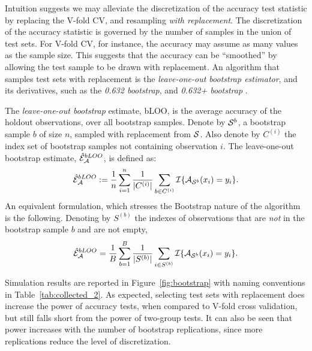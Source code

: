\documentclass[journal]{IEEEtran}
\begin{document}
Intuition suggests we may alleviate the discretization of the accuracy test statistic by replacing the V-fold CV, and resampling \emph{with replacement}.
The discretization of the accuracy statistic is governed by the number of samples in the union of test sets.
For V-fold CV, for instance, the accuracy may assume as many values as the sample size. 
This suggests that the accuracy can be ``smoothed'' by allowing the test sample to be drawn with replacement. 
An algorithm that samples test sets with replacement is the \emph{leave-one-out bootstrap estimator},  and its derivatives, such as the \emph{0.632 bootstrap}, and \emph{0.632+ bootstrap} \cite[Sec 7.11]{hastie_elements_2003}.
\begin{definition}[bLOO]
	\label{def:bloo}
	The \emph{leave-one-out bootstrap} estimate, bLOO, is the average accuracy of the holdout observations, over all bootstrap samples. 
	Denote by $\mathcal{S}^b$, a bootstrap sample $b$ of size $n$, sampled with replacement from $\mathcal{S}$. 
	Also denote by $C^{(i)}$ the index set of bootstrap samples not containing observation $i$.
	The leave-one-out bootstrap estimate, $\hat{\mathcal{E}}_{\mathcal{A}}^{bLOO}$,  is defined as:
	\begin{align}
	\hat{\mathcal{E}}_{\mathcal{A}}^{bLOO}:= \frac 1n \sum_{i=1}^{n} \frac{1}{|C^{(i)}|} \sum_{b \in C^{(i)}} \mathcal{I}{\{ \mathcal{A}_{\mathcal{S}^b}(x_i)=y_i \}}.
	\end{align}
	An equivalent formulation, which stresses the Bootstrap nature of the algorithm is the following. 
	Denoting by $S^{(b)}$ the indexes of observations that are \emph{not} in the bootstrap sample $b$ and are not empty, 
	\begin{align}
	\hat{\mathcal{E}}_{\mathcal{A}}^{bLOO} = \frac 1B \sum_{b=1}^{B} \frac{1}{|S^{(b)}|} \sum_{i \in S^{(b)}} \mathcal{I}{\{ \mathcal{A}_{\mathcal{S}^b}(x_i)=y_i \}}.
	\end{align}
\end{definition}


Simulation results are reported in Figure~\ref{fig:bootstrap} with naming conventions in Table~\ref{tab:collected_2}.
As expected, selecting test sets with replacement does increase the power of accuracy tests, when compared to V-fold cross validation, but still falls short from the power of two-group tests. 
It can also be seen that power increases with the number of bootstrap replications, since more replications reduce the level of discretization.

\bigskip
\end{document}
